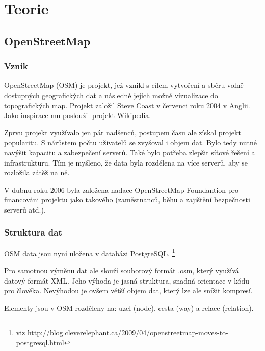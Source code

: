 \chapter{Teorie}
\label{2-Teorie}

\section{OpenStreetMap}
\label{OpenStreetMap}

\subsection{Vznik}
\label{vznik}
OpenStreetMap (OSM) je projekt, jež vznikl s cílem vytvoření a sběru 
volně dostupných geografických dat a následně jejich možné vizualizace
do topografických map. Projekt založil Steve Coast v červenci roku 
2004 v Anglii. Jako inspirace mu posloužil projekt Wikipedia.

Zprvu projekt využívalo jen pár nadšenců, postupem času ale získal
projekt popularitu. S nárůstem počtu uživatelů se zvyšoval i objem dat.
Bylo tedy nutné navýšit kapacitu a zabezpečení serverů.
Také bylo potřeba zlepšit síťové řešení a infrastrukturu.
Tím je myšleno, že data byla rozdělena na více serverů, aby se rozložila zátěž na ně.
 

V dubnu roku 2006 byla založena nadace OpenStreetMap Foundantion pro financováni 
projektu jako takového (zaměstnanců, běhu a zajištění bezpečnosti serverů atd.). \cite{wikiOSM}


\subsection{Struktura dat}
\label{struktura dat}
OSM data jsou nyní uložena v databázi PostgreSQL. \footnote{viz \url{http://blog.cleverelephant.ca/2009/04/openstreetmap-moves-to-postgresql.html}}

Pro samotnou výměnu dat ale slouží souborový formát {.osm}, který využívá datový
formát  XML. 
Jeho výhoda je jasná struktura, snadná orientace v kódu pro člověka. 
Nevýhodou je ovšem větší objem dat, který lze ale snížit kompresí. 

Elementy jsou v OSM rozděleny na: uzel (node), cesta (way) a
relace (relation).

